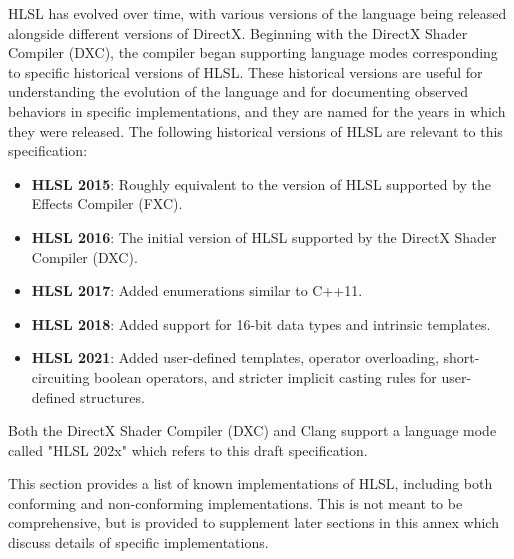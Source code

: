 

\p HLSL has evolved over time, with various versions of the language being
released alongside different versions of DirectX. Beginning with the DirectX
Shader Compiler (DXC), the compiler began supporting language modes
corresponding to specific historical versions of HLSL. These historical versions
are useful for understanding the evolution of the language and for documenting
observed behaviors in specific implementations, and they are named for the years
in which they were released. The following historical versions of HLSL are
relevant to this specification:

\begin{itemize}
  \item \textbf{HLSL 2015}: Roughly equivalent to the version of HLSL supported
  by the Effects Compiler (FXC).
  \item \textbf{HLSL 2016}: The initial version of HLSL supported by the DirectX
  Shader Compiler (DXC).
  \item \textbf{HLSL 2017}: Added enumerations similar to C++11.
  \item \textbf{HLSL 2018}: Added support for 16-bit data types and intrinsic
  templates.
  \item \textbf{HLSL 2021}: Added user-defined templates, operator overloading,
  short-circuiting boolean operators, and stricter implicit casting rules for
  user-defined structures.
\end{itemize}

\begin{note}
Both the DirectX Shader Compiler (DXC) and Clang support a language mode called
"HLSL 202x" which refers to this draft specification.
\end{note}


\p This section provides a list of known implementations of HLSL, including both
conforming and non-conforming implementations. This is not meant to be
comprehensive, but is provided to supplement later sections in this annex which
discuss details of specific implementations.

